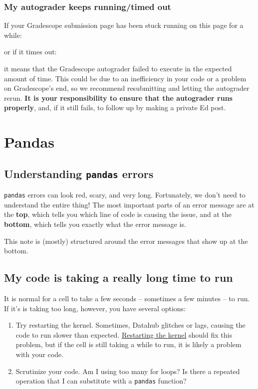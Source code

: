 \documentclass[
  letterpaper,
  DIV=11,
  numbers=noendperiod]{scrreprt}
\providecommand{\tightlist}{%
  \setlength{\itemsep}{0pt}\setlength{\parskip}{0pt}}\usepackage{longtable,booktabs,array}
\begin{document}
\subsection{My autograder keeps running/timed
out}\label{my-autograder-keeps-runningtimed-out}

If your Gradescope submission page has been stuck running on this page
for a while:

or if it times out:

it means that the Gradescope autograder failed to execute in the
expected amount of time. This could be due to an inefficiency in your
code or a problem on Gradescope's end, so we recommend resubmitting and
letting the autograder rerun. \textbf{It is your responsibility to
ensure that the autograder runs properly}, and, if it still fails, to
follow up by making a private Ed post.


\chapter{Pandas}\label{pandas}

\section{\texorpdfstring{Understanding \texttt{pandas}
errors}{Understanding pandas errors}}\label{understanding-pandas-errors}

\texttt{pandas} errors can look red, scary, and very long. Fortunately,
we don't need to understand the entire thing! The most important parts
of an error message are at the \textbf{top}, which tells you which line
of code is causing the issue, and at the \textbf{bottom}, which tells
you exactly what the error message is.

This note is (mostly) structured around the error messages that show up
at the bottom.

\section{My code is taking a really long time to
run}\label{my-code-is-taking-a-really-long-time-to-run}

It is normal for a cell to take a few seconds -- sometimes a few minutes
-- to run. If it's is taking too long, however, you have several
options:

\begin{enumerate}
\def\labelenumi{\arabic{enumi}.}
\tightlist
\item
  Try restarting the kernel. Sometimes, Datahub glitches or lags,
  causing the code to run slower than expected.
  \href{https://ds100.org/debugging-guide/jupyter101/jupyter101.html\#restarting-kernel}{Restarting
  the kernel} should fix this problem, but if the cell is still taking a
  while to run, it is likely a problem with your code.
\item
  Scrutinize your code. Am I using too many for loops? Is there a
  repeated operation that I can substitute with a \texttt{pandas}
  function?
\end{enumerate}
\end{document}
